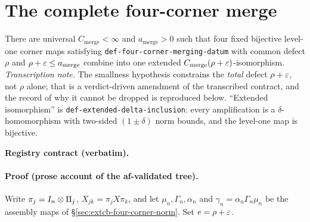 \section{The complete four-corner merge}\label{sec:extcb-four-corner-merge}

\begin{lemma}\label{lem:extcb-four-corner-merge}
There are universal $C_{\mathrm{merge}}<\infty$ and $a_{\mathrm{merge}}>0$ such that four
fixed bijective level-one corner maps satisfying \texttt{def-four-corner-merging-datum}
with common defect $\rho$ and $\rho+\varepsilon\le a_{\mathrm{merge}}$ combine into one extended
$C_{\mathrm{merge}}(\rho+\varepsilon)$-isomorphism.
\emph{Transcription note.} The smallness hypothesis constrains the \emph{total} defect
$\rho+\varepsilon$, not $\rho$ alone; that is a verdict-driven amendment of the transcribed
contract, and the record of why it cannot be dropped is reproduced below. ``Extended
isomorphism'' is \texttt{def-extended-delta-inclusion}: every amplification is a
$\delta$-homomorphism with two-sided $(1\pm\delta)$ norm bounds, and the level-one map is
bijective.
\end{lemma}

\noindent\textbf{Registry contract (verbatim).}

\paragraph{Proof (prose account of the af-validated tree).}
Write $\pi_j=I_{n}\otimes \Pi_j$, $X_{jk}=\pi_jX\pi_k$, and let $\mu_n,\Gamma_n,\alpha_n$
and $\gamma_n=\alpha_n\Gamma_n\mu_n$ be the assembly maps of
\S\ref{sec:extcb-four-corner-norm}. Set $e=\rho+\varepsilon$.

